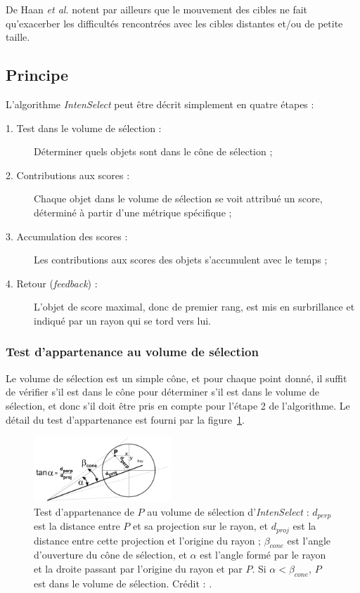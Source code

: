 	De Haan \emph{et al.} notent par ailleurs que le mouvement des cibles ne fait qu'exacerber les difficultés rencontrées avec les cibles distantes et/ou de petite taille.
	
	\subsection{Principe}
	L'algorithme \emph{IntenSelect} peut être décrit simplement en quatre étapes :
	
	\begin{description}
		\item[1. Test dans le volume de sélection :] Déterminer quels objets sont dans le cône de sélection ;
		\item[2. Contributions aux scores :] Chaque objet dans le volume de sélection se voit attribué un score, déterminé à partir d'une métrique spécifique ;
		\item[3. Accumulation des scores :] Les contributions aux scores des objets s'accumulent avec le temps ;
		\item[4. Retour (\emph{feedback}) :] L'objet de score maximal, donc de premier rang, est mis en surbrillance et indiqué par un rayon qui se \og tord \fg{} vers lui.
	\end{description}
	
	\subsubsection{Test d'appartenance au volume de sélection}
	Le volume de sélection est un simple cône, et pour chaque point donné, il suffit de vérifier s'il est dans le cône pour déterminer s'il est dans le volume de sélection, et donc s'il doit être pris en compte pour l'étape 2 de l'algorithme. Le détail du test d'appartenance est fourni par la figure~\ref{fig:intensCone}.
	
	\begin{figure} %
		\centering
		\includegraphics[width=0.46\textwidth]{figures/ch2/intensCone}
		\caption[\emph{IntenSelect} -- test d'appartenance au volume de sélection]{Test d'appartenance de $P$ au volume de sélection d'\emph{IntenSelect} : $d_{perp}$ est la distance entre $P$ et sa projection sur le rayon, et $d_{proj}$ est la distance entre cette projection et l'origine du rayon ; $\beta_{cone}$ est l'angle d'ouverture du cône de sélection, et $\alpha$ est l'angle formé par le rayon et la droite passant par l'origine du rayon et par $P$. Si $\alpha < \beta_{cone}$, $P$ est dans le volume de sélection. Crédit : \cite{de2005intenselect}.}
		\label{fig:intensCone}
	\end{figure}
	
